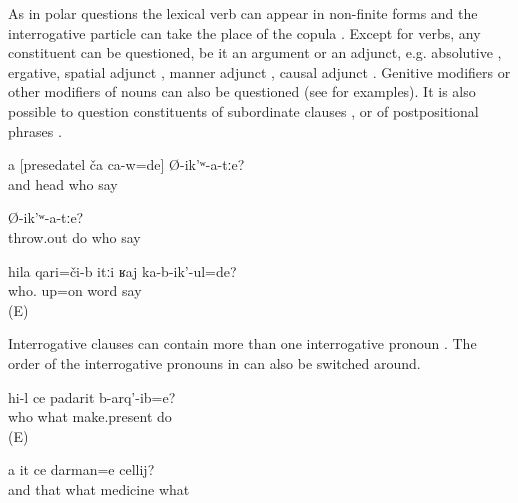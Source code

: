As in polar questions the lexical verb can appear in non-finite forms  and the interrogative particle can take the place of the copula . Except for verbs, any constituent can be questioned, be it an argument or an adjunct, e.g. absolutive , ergative, spatial adjunct , manner adjunct , causal adjunct . Genitive modifiers or other modifiers of nouns can also be questioned (see  for examples). It is also possible to question constituents of subordinate clauses ,  or of postpositional phrases .
%
\begin{exe}
	\ex	\label{ex:‎Who did you say was the head (of the kolkhoz)}
	\gll	a	[presedatel	ča 	ca-w=de]	Ø-ik'ʷ-a-tːe?\\
		and	head	who		say\\
	\glt	{}

	\ex	\label{ex:The ones who were thrown out, who did you (masc.) say was this}
		Ø-ik'ʷ-a-tːe?\\
		throw.out	do 	who	say\\
	\glt	{}

	\ex	\label{ex:About whom were they talking}
	\gll	hila	qari=či-b	itːi	ʁaj	ka-b-ik'-ul=de?\\
		who.	up=on		word	say\\
	\glt	{} (E)
\end{exe}

Interrogative clauses can contain more than one interrogative pronoun . The order of the interrogative pronouns in  can also be switched around.
%
\begin{exe}
	\ex	\label{ex:Who did make which present}
	\gll	hi-l ce padarit b-arq'-ib=e?\\
		who	what	make.present	do\\
	\glt	{} (E)

	\ex	\label{ex:‎‎‎And this is what medicine for what}
	\gll	a	it	ce	darman=e	cellij?\\
		and	that	what	medicine	what\\
	\glt	{}
\end{exe}

